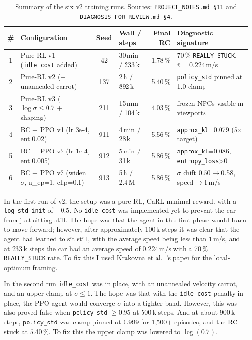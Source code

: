 \documentclass[conference]{IEEEtran}
\begin{document}
\begin{table}[!htbp]
\caption{Summary of the six v2 training runs. Sources:
\texttt{PROJECT\_NOTES.md~\S11} and
\texttt{DIAGNOSIS\_FOR\_REVIEW.md~\S4}.}
\label{tab:runs}
\centering\small
\renewcommand{\arraystretch}{1.25}
\begin{tabular}{@{}clclrp{6cm}@{}}
\toprule
\textbf{\#} & \textbf{Configuration} & \textbf{Seed} & \textbf{Wall / steps} & \textbf{Final RC} & \textbf{Diagnostic signature} \\
\midrule
1 & Pure-RL v1 (\texttt{idle\_cost} added)              & 42  & 30\,min / 233\,k & 1.78\,\% & 70\,\% \texttt{REALLY\_STUCK}, $\bar v=0.224$\,m/s \\
2 & Pure-RL v2 (+ unannealed carrot)                    & 137 & 2\,h / 892\,k    & 5.40\,\% & \texttt{policy\_std} pinned at 1.0 clamp \\
3 & Pure-RL v3 ($\log\sigma\!\le\!0.7$ + shaping)       & 211 & 15\,min / 104\,k & 4.03\,\% & frozen NPCs visible in viewports \\
4 & BC + PPO v1 (lr 3e\textsc{-}4, ent 0.02)            & 911 & 4\,min / 28\,k   & 5.56\,\% & \texttt{approx\_kl}=0.079 (5$\times$ target) \\
5 & BC + PPO v2 (lr 1e\textsc{-}4, ent 0.005)           & 912 & 5\,min / 31\,k   & 5.86\,\% & \texttt{approx\_kl}=0.086, \texttt{entropy\_loss}>0 \\
6 & BC + PPO v3 (widen $\sigma$, n\_ep=1, clip=0.1)     & 913 & 5\,h / 2.4\,M    & 5.86\,\% & $\sigma$ drift 0.50$\to$0.58, speed$\to$1\,m/s \\
\bottomrule
\end{tabular}
\end{table}

In the first run of v2, the setup was a pure-RL,
CaRL-minimal reward, with a \texttt{log\_std\_init} of
$-0.5$. No \texttt{idle\_cost} was implemented yet to
prevent the car from just sitting still. The hope was that
the agent in this first phase would learn to move forward;
however, after approximately 100\,k steps it was clear that
the agent had learned to sit still, with the average speed
being less than 1\,m/s, and at 233\,k steps the car had an
average speed of 0.224\,m/s with a 70\,\%
\texttt{REALLY\_STUCK} rate. To fix this I used Krakovna
et al.~\cite{krakovna}'s paper for the local-optimum
framing.

In the second run \texttt{idle\_cost} was in place, with an
unannealed velocity carrot, and an upper clamp at
$\sigma \le 1$. The hope was that with the
\texttt{idle\_cost} penalty in place, the PPO agent would
converge $\sigma$ into a tighter band. However, this was
also proved false when \texttt{policy\_std} $\ge 0.95$ at
500\,k steps. And at about 900\,k steps,
\texttt{policy\_std} was clamp-pinned at 0.999 for
1{,}500$+$ episodes, and the RC stuck at 5.40\,\%. To fix
this the upper clamp was lowered to $\log(0.7)$.
\end{document}
